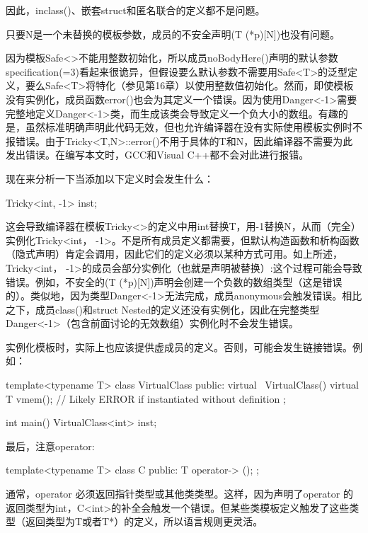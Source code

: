 因此，inclass()、嵌套struct和匿名联合的定义都不是问题。

只要N是一个未替换的模板参数，成员的不安全声明(T (*p)[N])也没有问题。

因为模板Safe<>不能用整数初始化，所以成员noBodyHere()声明的默认参数specification(=3)看起来很诡异，但假设要么默认参数不需要用Safe<T>的泛型定义，要么Safe<T>将特化（参见第16章）以使用整数值初始化。然而，即使模板没有实例化，成员函数error()也会为其定义一个错误。因为使用Danger<-1>需要完整地定义Danger<-1>类，而生成该类会导致定义一个负大小的数组。有趣的是，虽然标准明确声明此代码无效，但也允许编译器在没有实际使用模板实例时不报错误。由于Tricky<T,N>::error()不用于具体的T和N，因此编译器不需要为此发出错误。在编写本文时，GCC和Visual C++都不会对此进行报错。

现在来分析一下当添加以下定义时会发生什么：

\begin{cpp}
Tricky<int, -1> inst;
\end{cpp}

这会导致编译器在模板Tricky<>的定义中用int替换T，用-1替换N，从而（完全）实例化Tricky<int， -1>。不是所有成员定义都需要，但默认构造函数和析构函数（隐式声明）肯定会调用，因此它们的定义必须以某种方式可用。如上所述，Tricky<int， -1>的成员会部分实例化（也就是声明被替换）:这个过程可能会导致错误。例如，不安全的(T (*p)[N])声明会创建一个负数的数组类型（这是错误的）。类似地，因为类型Danger<-1>无法完成，成员anonymous会触发错误。相比之下，成员class()和struct Nested的定义还没有实例化，因此在完整类型Danger<-1>（包含前面讨论的无效数组）实例化时不会发生错误。

实例化模板时，实际上也应该提供虚成员的定义。否则，可能会发生链接错误。例如：

\begin{cpp}
template<typename T>
class VirtualClass {
	public:
	virtual ~VirtualClass() {}
	virtual T vmem(); // Likely ERROR if instantiated without definition
};

int main() {
	VirtualClass<int> inst;
}
\end{cpp}

最后，注意operator\inlcpp{->}:

\begin{cpp}
template<typename T>
class C {
	public:
	T operator-> ();
};
\end{cpp}

通常，operator\inlcpp{->} 必须返回指针类型或其他类类型。这样，因为声明了operator\inlcpp{->} 的返回类型为int，C<int>的补全会触发一个错误。但某些类模板定义触发了这些类型（返回类型为T或者T*）的定义，所以语言规则更灵活。

